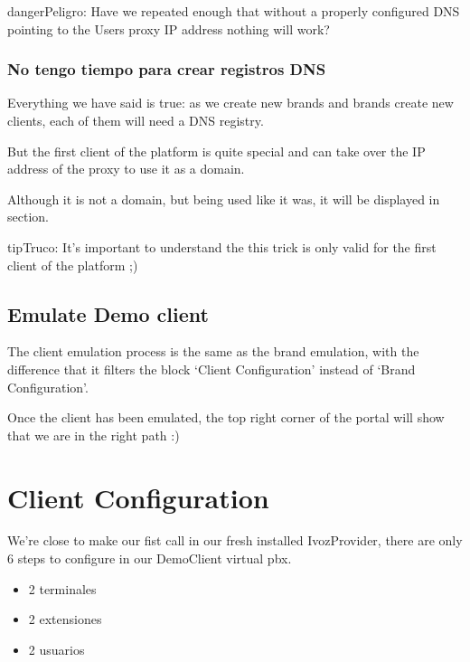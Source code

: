 \documentclass[letterpaper,10pt,spanish]{sphinxmanual}
\begin{document}
\begin{notice}{danger}{Peligro:}
Have we repeated enough that without a properly configured DNS
pointing to the Users proxy IP address nothing will work?
\end{notice}


\subsubsection{No tengo tiempo para crear registros DNS}
\label{getting_started/internal_calls/brand_portal:dnshack}\label{getting_started/internal_calls/brand_portal:i-have-no-time-for-a-dns-registry}
Everything we have said is true: as we create new brands and brands create new
clients, each of them will need a DNS registry.

But the first client of the platform is quite special and can take over the IP
address of the proxy to use it as a domain.

Although it is not a domain, but being used like it was, it will be displayed
in {\hyperref[administration_portal/platform/sip_domains:sip\string-domains]{}} section.

\begin{notice}{tip}{Truco:}
It’s important to understand the this trick is only valid for the first
client of the platform ;)
\end{notice}


\subsection{Emulate Demo client}
\label{getting_started/internal_calls/brand_portal:emulate-client}\label{getting_started/internal_calls/brand_portal:emulate-demo-client}
The client emulation process is the same as the brand emulation, with the
difference that it filters the block ‘Client Configuration’ instead of
‘Brand Configuration’.

Once the client has been emulated, the top right corner of the portal will
show that we are in the right path :)


\section{Client Configuration}
\label{getting_started/internal_calls/client_portal:client-configuration}\label{getting_started/internal_calls/client_portal::doc}
We're close to make our fist call in our fresh installed IvozProvider, there
are only 6 steps to configure in our DemoClient virtual pbx.
\begin{itemize}
\item {} 
2 terminales

\item {} 
2 extensiones

\item {} 
2 usuarios

\end{itemize}
\end{document}
